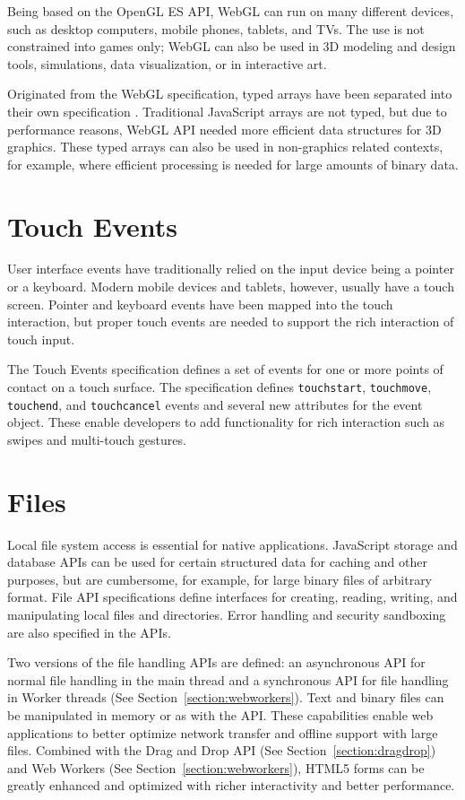 Being based on the OpenGL ES API, WebGL can run on many different
devices, such as desktop computers, mobile phones, tablets, and
TVs. The use is not constrained into games only; WebGL can also be
used in 3D modeling and design tools, simulations, data visualization,
or in interactive art.

Originated from the WebGL specification, typed arrays have been
separated into their own specification \cite{TypedArrays}. Traditional
JavaScript arrays are not typed, but due to performance reasons, WebGL
API needed more efficient data structures for 3D graphics. These typed
arrays can also be used in non-graphics related contexts, for example,
where efficient processing is needed for large amounts of binary data.

\section{Touch Events}

User interface events have traditionally relied on the input device
being a pointer or a keyboard. Modern mobile devices and tablets,
however, usually have a touch screen. Pointer and keyboard events have
been mapped into the touch interaction, but proper touch events are
needed to support the rich interaction of touch input.

The Touch Events specification \cite{touchevents} defines a set of
events for one or more points of contact on a touch surface. The
specification defines \texttt{touchstart}, \texttt{touchmove},
\texttt{touchend}, and \texttt{touchcancel} events and several new
attributes for the event object. These enable developers to add
functionality for rich interaction such as swipes and multi-touch
gestures.

\section{Files}
\label{section:fileapi}

Local file system access is essential for native
applications. JavaScript storage and database APIs can be used for
certain structured data for caching and other purposes, but are
cumbersome, for example, for large binary files of arbitrary
format. File API specifications \cite{FileAPI, FileAPIWriter,
  FileAPIDir} define interfaces for creating, reading, writing, and
manipulating local files and directories. Error handling and security
sandboxing are also specified in the APIs.

Two versions of the file handling APIs are defined: an asynchronous
API for normal file handling in the main thread and a synchronous API
for file handling in Worker threads (See
Section~\ref{section:webworkers}). Text and binary files can be
manipulated in memory or as   with the
 API. These capabilities enable web applications to better
optimize network transfer and offline support with large
files. Combined with the Drag and Drop API (See
Section~\ref{section:dragdrop}) and Web Workers (See
Section~\ref{section:webworkers}), HTML5 forms can be greatly enhanced
and optimized with richer interactivity and better performance.

